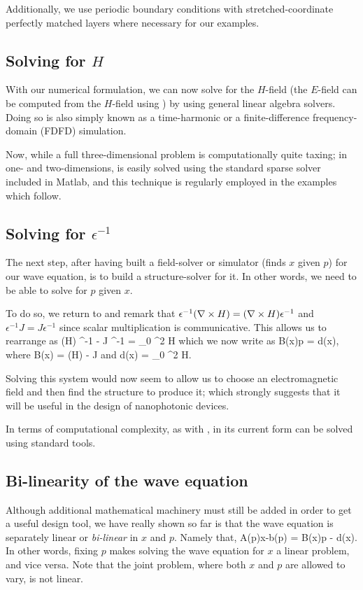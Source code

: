 Additionally,  we use periodic boundary conditions
    with stretched-coordinate %
    perfectly matched layers where necessary for our examples.

\subsection{Solving for $H$}
With our numerical formulation, we can now solve for the $H$-field
    (the $E$-field can be computed from the $H$-field using )
    by using general linear algebra solvers.
Doing so is also simply known as a time-harmonic or 
    a finite-difference frequency-domain (FDFD) simulation.

Now, while a full three-dimensional problem
    is computationally quite taxing;
    in one- and two-dimensions, 
     is easily solved using the standard sparse solver
    included in Matlab,
    and this technique is regularly employed 
    in the examples which follow.


\subsection{Solving for $\epsilon^{-1}$}
The next step,
    after having built a field-solver or simulator
    (finds $x$ given $p$) for our wave equation,
    is to build a structure-solver for it.
In other words, we need to be able to solve for $p$ given $x$.

To do so, we return to 
    and remark that 
    $\epsilon^{-1} (\nabla\times H) = (\nabla\times H) \epsilon^{-1}$ and
    $\epsilon^{-1} J = J \epsilon^{-1}$ 
    since scalar multiplication is communicative.
This allows us to rearrange  as
\BE \curl (\curl H) \epsilon^{-1} - \curl J \epsilon^{-1}  = \mu_0 \omega^2 H  \EE
which we now write as 
\BE B(x)p = d(x), \label{eq:Bd} \EE 
    where
\BE B(x) = \curl (\curl H) - \curl J\EE
    and 
\BE d(x)  = \mu_0 \omega^2 H.  \EE

Solving this system would now seem to allow us
    to choose an electromagnetic field
    and then find the structure to produce it;
    which strongly suggests that it will be useful in
    the design of nanophotonic devices.

In terms of computational complexity, as with , 
     in its current form can be solved using standard tools.

\subsection{Bi-linearity of the wave equation}
Although additional mathematical machinery must still be added
    in order to get a useful design tool,
    we have really shown so far is that the wave equation is 
    separately linear or \emph{bi-linear} in $x$ and $p$.
Namely that,
\BE A(p)x-b(p) = B(x)p - d(x). \EE
In other words, fixing $p$ makes solving the wave equation for $x$
    a linear problem, and vice versa.
Note that the joint problem,
    where both $x$ and $p$ are allowed to vary,
    is not linear.

